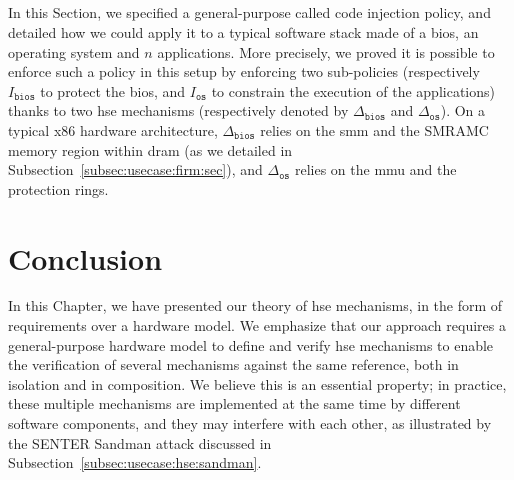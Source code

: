 \subsection*{}

In this Section, we specified a general-purpose called code injection policy,
and detailed how we could apply it to a typical software stack made of a
\ac{bios}, an operating system and \( n \) applications.
%
More precisely, we proved it is possible to enforce such a policy in this setup
by enforcing two sub-policies (respectively \( I_{\mathtt{bios}} \) to protect
the \ac{bios}, and \( I_{\mathtt{os}} \) to constrain the execution of the
applications) thanks to two \ac{hse} mechanisms (respectively denoted by
\( \Delta_{\mathtt{bios}} \) and \( \Delta_{\mathtt{os}} \)).
%
On a typical x86 hardware architecture, \( \Delta_{\mathtt{bios}} \) relies on
the \ac{smm} and the SMRAMC memory region within \ac{dram} (as we detailed in
Subsection~\ref{subsec:usecase:firm:sec}), and \( \Delta_{\mathtt{os}} \) relies
on the \ac{mmu} and the protection rings.

\section{Conclusion}

In this Chapter, we have presented our theory of \ac{hse} mechanisms, in the
form of requirements over a hardware model.
%
We emphasize that our approach requires a general-purpose hardware model to
define and verify \ac{hse} mechanisms to enable the verification of several
mechanisms against the same reference, both in isolation and in composition.
%
We believe this is an essential property; in practice, these multiple mechanisms
are implemented at the same time by different software components, and they may
interfere with each other, as illustrated by the SENTER Sandman attack discussed
in Subsection~\ref{subsec:usecase:hse:sandman}.

